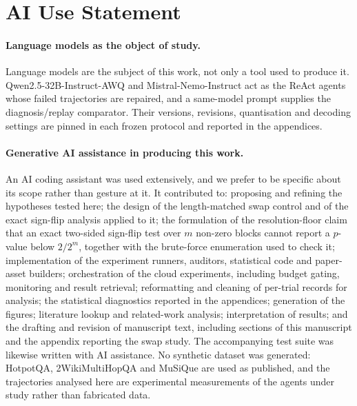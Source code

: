 %
\section*{AI Use Statement}

\paragraph{Language models as the object of study.}
Language models are the subject of this work, not only a tool used to produce
it. Qwen2.5-32B-Instruct-AWQ and Mistral-Nemo-Instruct act as the ReAct agents
whose failed trajectories are repaired, and a same-model prompt supplies the
diagnosis/replay comparator. Their versions, revisions, quantisation and
decoding settings are pinned in each frozen protocol and reported in the
appendices.

\paragraph{Generative AI assistance in producing this work.}
An AI coding assistant was used extensively, and we prefer to be specific about
its scope rather than gesture at it. It contributed to: proposing and refining
the hypotheses tested here; the design of the length-matched swap control and
of the exact sign-flip analysis applied to it; the formulation of the
resolution-floor claim that an exact two-sided sign-flip test over $m$ non-zero
blocks cannot report a $p$-value below $2/2^{m}$, together with the
brute-force enumeration used to check it; implementation of the experiment
runners, auditors, statistical code and paper-asset builders; orchestration of
the cloud experiments, including budget gating, monitoring and result
retrieval; reformatting and cleaning of per-trial records for analysis; the
statistical diagnostics reported in the appendices; generation of the figures;
literature lookup and related-work analysis; interpretation of results; and the
drafting and revision of manuscript text, including sections of this
manuscript and the appendix reporting the swap study. The accompanying test
suite was likewise written with AI assistance. No synthetic dataset was
generated: HotpotQA, 2WikiMultiHopQA and MuSiQue are used as published, and
the trajectories analysed here are experimental measurements of the agents
under study rather than fabricated data.

